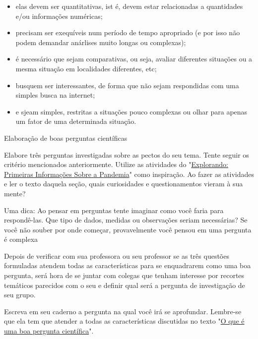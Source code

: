 \begin{itemize}
\item elas devem ser quantitativas, ist é, devem estar relacionadas a quantidades e/ou informações numéricas;
\item precisam ser exequíveis num período de tempo apropriado (e por isso não podem demandar anárlises muito longas ou complexas);
\item é necessário que sejam comparativas, ou seja, avaliar diferentes situações ou a mesma situação em localidades diferentes, etc;
\item busquem ser interessantes, de forma que não sejam respondidas com uma simples busca na internet;
\item e sjeam simples, restritas a situações pouco complexas ou olhar para apenas um fator de uma determinada situação.
\end{itemize}



\begin{task}{Elaboração de boas perguntas científicas}

Elabore três perguntas investigadas sobre as pectos do seu tema. Tente seguir os critério mencionados anteriormente. Utilize as atividades do "\hyperref[primeiras-informacoes]{Explorando: Primeiras Informações Sobre a Pandemia}"{} como inspiração. Ao fazer as atividades e ler o texto daquela seção, quais curiosidades e questionamentos vieram à sua mente?

Uma dica: Ao pensar em perguntas tente imaginar como você faria para respondê-las. Que tipo de dados, medidas ou observações seriam necessárias? Se você não souber por onde começar, provavelmente você pensou em uma pergunta é complexa

Depois de verificar com sua professora ou seu professor se as três questões formuladas atendem todas as características para se enquadrarem como uma boa pergunta, será hora de se juntar com colegas que tenham interesse por recortes temáticos parecidos com o seu e definir qual será a pergunta de investigação de seu grupo.

Escreva em seu caderno a pergunta na qual você irá se aprofundar. Lembre-se que ela tem que atender a todas as características discutidas no texto "\hyperref[pergunta-cientifica]{O que é uma boa pergunta científica}".

\end{task}

